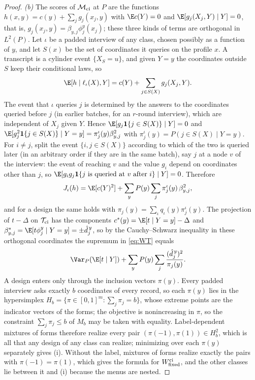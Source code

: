 \begin{proof}
\emph{(b)} The scores of $\mathcal M_{\rm ci}$ at $P$ are the functions
$h(x,y)=c(y)+\sum_jg_j(x_j,y)$ with $\E c(Y)=0$ and $\E[g_j(X_j,Y)\mid Y]=0$,
that is, $g_j(x_j,y)=\beta_{y,j}\phi^y_j(x_j)$; these three kinds of terms are
orthogonal in $L^2(P)$. Let $\iota$ be a padded interview of any class, chosen
possibly as a function of $y$, and let $S(x)$ be the set of coordinates it
queries on the profile $x$. A transcript is a cylinder event $\{X_S=u\}$, and
given $Y=y$ the coordinates outside $S$ keep their conditional laws, so
\[
 \E[h\mid\ell_\iota(X),Y]=c(Y)+\sum_{j\in S(X)}g_j(X_j,Y).
\]
The event that $\iota$ queries $j$ is determined by the answers to the
coordinates queried before $j$ (in earlier batches, for an $r$-round
interview), which are independent of $X_j$ given $Y$. Hence
$\E[g_j\mathbf 1\{j\in S(X)\}\mid Y]=0$ and
$\E[g_j^2\mathbf 1\{j\in S(X)\}\mid Y=y]=\pi^\iota_j(y)\beta_{y,j}^2$ with
$\pi^\iota_j(y)=P(j\in S(X)\mid Y=y)$. For $i\ne j$, split the event
$\{i,j\in S(X)\}$ according to which of the two is queried later (in an arbitrary order if they are in the same batch), say $j$ at
a node $v$ of the interview: the event of reaching $v$ and the value $g_i$
depend on coordinates other than $j$, so
$\E[g_ig_j\mathbf 1\{\text{$j$ is queried at $v$ after $i$}\}\mid Y]=0$. Therefore
\[
 J_\iota(h)=\E[c(Y)^2]+\sum_yP(y)\sum_j\pi^\iota_j(y)\,\beta_{y,j}^2 ,
\]
and for a design the same holds with $\pi_j(y)=\sum_\iota q_\iota(y)\pi^\iota_j(y)$.
The projection of $t-\Delta$ on $\mathcal T_{\rm ci}$ has the components
$c^\ast(y)=\E[t\mid Y=y]-\Delta$ and
$\beta^\ast_{y,j}=\E[t\phi^y_j\mid Y=y]=\pm\hat d^{\,y}_j$, so by the
Cauchy--Schwarz inequality in these orthogonal coordinates the supremum in
\eqref{eq:WT} equals
\[
 \Var_P(\E[t\mid Y])+\sum_yP(y)\sum_j\frac{(\hat d^{\,y}_j)^2}{\pi_j(y)} .
\]
A design enters only through the inclusion vectors $\pi(y)$. Every padded
interview asks exactly $b$ coordinates of every record, so each $\pi(y)$ lies
in the hypersimplex $H_b=\{\pi\in[0,1]^m:\sum_j\pi_j=b\}$, whose extreme points
are the indicator vectors of the forms; the objective is nonincreasing in $\pi$, so the constraint $\sum_j\pi_j\le b$ of $M_b$ may be taken with equality. Label-dependent mixtures of forms
therefore realize every pair $(\pi(-1),\pi(1))\in H_b^2$, which is all that
any design of any class can realize; minimizing over each $\pi(y)$ separately
gives (i). Without the label, mixtures of forms realize exactly the pairs
with $\pi(-1)=\pi(1)$, which gives the formula for $W^{\rm ci}_{\rm fixed}$,
and the other classes lie between it and (i) because the menus are nested.

\end{proof}
